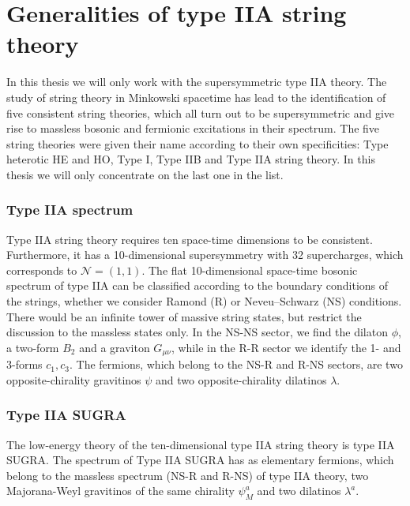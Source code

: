 \chapter{Generalities of type IIA string theory}

In this thesis we will only work with the supersymmetric type IIA theory. 
The study of string theory in Minkowski spacetime has lead to the identification of five consistent string theories, which all turn out to be supersymmetric and give rise to massless bosonic and fermionic excitations in their spectrum. The five string theories were given their name according to their own specificities: Type heterotic HE and HO, Type I, Type IIB and Type IIA string theory. In this thesis we will only concentrate on the last one in the list. 

\subsection{Type IIA spectrum}
Type IIA string theory requires ten space-time dimensions to be consistent.
Furthermore, it has a 10-dimensional supersymmetry with 32 supercharges, which corresponds to $\mathcal N=(1,1)$.
The flat 10-dimensional space-time bosonic spectrum of type IIA can be classified according to
the boundary conditions of the strings, whether we consider Ramond (R) or Neveu–Schwarz (NS) conditions.
There would be an infinite tower of massive string states, but restrict the discussion to the massless states only.
In the NS-NS sector, we find the dilaton $\phi$, a two-form $B_2$ and a graviton $G_{\mu\nu}$,
while in the R-R sector we identify the 1- and 3-forms $c_1, c_3$.
The fermions, which belong to the NS-R and R-NS sectors, are two opposite-chirality gravitinos $\psi$ and two opposite-chirality dilatinos $\lambda$.

\subsection{Type IIA SUGRA}
 
The low-energy theory of the ten-dimensional type IIA string theory is type IIA SUGRA.
The spectrum of Type IIA SUGRA has as elementary fermions, which belong to the massless spectrum (NS-R and R-NS) of type IIA theory,
two Majorana-Weyl gravitinos of the same chirality $\psi_M^a$ and two dilatinos $\lambda^a$. 


